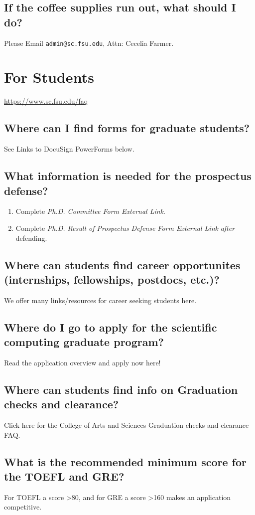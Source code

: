 \documentclass[12pt,a4paper]{article}
\begin{document}
\subsection{If the coffee supplies run out, what should I do?}
Please Email \texttt{admin@sc.fsu.edu}, Attn: Cecelia Farmer.

\section{For Students}
\url{https://www.sc.fsu.edu/faq}
\subsection{Where can I find forms for graduate students?}
See Links to DocuSign PowerForms below.

\subsection{What information is needed for the prospectus defense?}
\begin{enumerate}
    \item Complete \textit{Ph.D. Committee Form External Link}.
    \item Complete \textit{Ph.D. Result of Prospectus Defense Form External Link} \textit{after} defending.
\end{enumerate}

\subsection{Where can students find career opportunites (internships, fellowships, postdocs, etc.)?}
We offer many links/resources for career seeking students here.

\subsection{Where do I go to apply for the scientific computing graduate program?}
Read the application overview and apply now here!

\subsection{Where can students find info on Graduation checks and clearance?}
Click here for the College of Arts and Sciences Graduation checks and clearance FAQ.

\subsection{What is the recommended minimum score for the TOEFL and GRE?}
For TOEFL a score >80, and for GRE a score >160 makes an application competitive.
\end{document}
